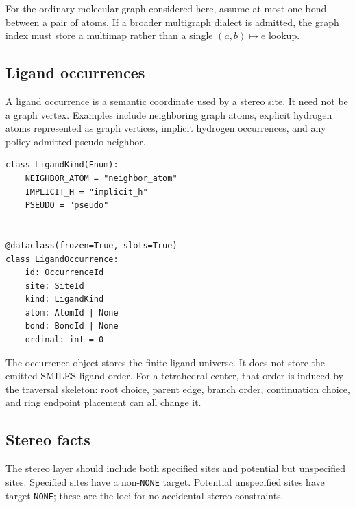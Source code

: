 \documentclass[10pt,a4paper]{article}
\theoremstyle{definition}
\theoremstyle{remark}
\begin{document}
For the ordinary molecular graph considered here, assume at most one bond between
a pair of atoms.  If a broader multigraph dialect is admitted, the graph index
must store a multimap rather than a single \((a,b)\mapsto e\) lookup.

\subsection{Ligand occurrences}

A ligand occurrence is a semantic coordinate used by a stereo site.  It need not
be a graph vertex.  Examples include neighboring graph atoms, explicit hydrogen
atoms represented as graph vertices, implicit hydrogen occurrences, and any
policy-admitted pseudo-neighbor.

\begin{lstlisting}
class LigandKind(Enum):
    NEIGHBOR_ATOM = "neighbor_atom"
    IMPLICIT_H = "implicit_h"
    PSEUDO = "pseudo"


@dataclass(frozen=True, slots=True)
class LigandOccurrence:
    id: OccurrenceId
    site: SiteId
    kind: LigandKind
    atom: AtomId | None
    bond: BondId | None
    ordinal: int = 0
\end{lstlisting}

The occurrence object stores the finite ligand universe.  It does not store the
emitted SMILES ligand order.  For a tetrahedral center, that order is induced by
the traversal skeleton: root choice, parent edge, branch order, continuation
choice, and ring endpoint placement can all change it.

\subsection{Stereo facts}

The stereo layer should include both specified sites and potential but
unspecified sites.  Specified sites have a non-\texttt{NONE} target.  Potential
unspecified sites have target \texttt{NONE}; these are the loci for
no-accidental-stereo constraints.
\end{document}

